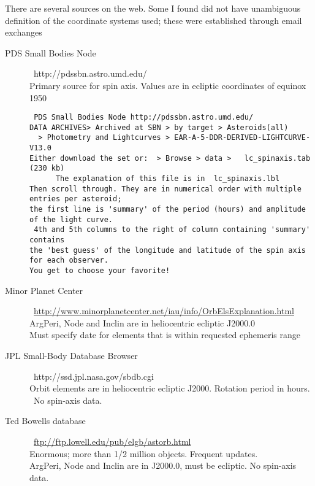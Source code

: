 \documentclass{article}
\newcommand{\qi}{\\ \hspace*{2.em}}      %
\begin{document}
There are several sources on the web. Some I found did not have unambiguous definition of the coordinate systems used; these were established through email exchanges
\begin{description}  %

\item [PDS Small Bodies Node] \  http://pdssbn.astro.umd.edu/
\\ Primary source for spin axis.  Values are in ecliptic coordinates of equinox 1950
\vspace{-3.mm} 
\begin{verbatim}
 PDS Small Bodies Node http://pdssbn.astro.umd.edu/ 
DATA ARCHIVES> Archived at SBN > by target > Asteroids(all) 
  > Photometry and Lightcurves > EAR-A-5-DDR-DERIVED-LIGHTCURVE-V13.0 
Either download the set or:  > Browse > data >   lc_spinaxis.tab (230 kb)
      The explanation of this file is in  lc_spinaxis.lbl
Then scroll through. They are in numerical order with multiple entries per asteroid; 
the first line is 'summary' of the period (hours) and amplitude of the light curve.
 4th and 5th columns to the right of column containing 'summary' contains 
the 'best guess' of the longitude and latitude of the spin axis for each observer.
You get to choose your favorite! 
\end{verbatim}


\item [Minor Planet Center]  \  \url{http://www.minorplanetcenter.net/iau/info/OrbElsExplanation.html} 
\\ ArgPeri, Node and Inclin are in heliocentric ecliptic J2000.0
\qi Must specify date for elements that is within requested ephemeris range

\item [JPL Small-Body Database Browser]  \ http://ssd.jpl.nasa.gov/sbdb.cgi
\\ Orbit elements are in heliocentric ecliptic J2000.  Rotation period in hours. \ No spin-axis data.

\item [Ted Bowells database]   \ \url{ftp://ftp.lowell.edu/pub/elgb/astorb.html}
\\ Enormous; more than 1/2 million objects. Frequent updates. 
\\ ArgPeri, Node and Inclin are in J2000.0,  must be ecliptic. No spin-axis data.

\end{description}
\end{document}
